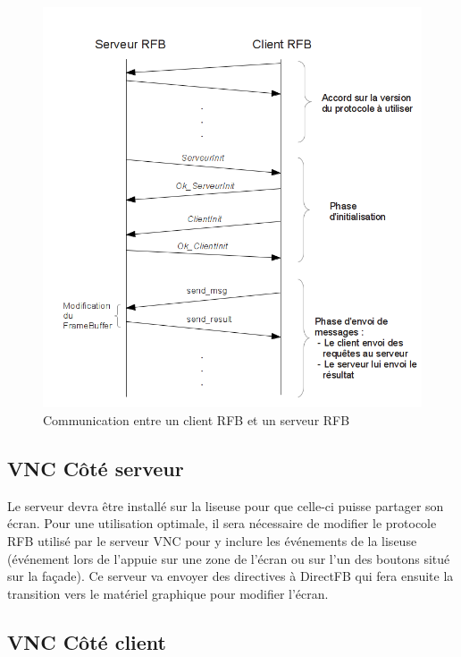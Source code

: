\begin{figure}[h!]
	\begin{center}
		\includegraphics[scale=0.6]{RFBProtocol.png}
		\caption{Communication entre un client RFB et un serveur RFB}
	\end{center}
\end{figure}

\subsection{VNC Côté serveur}

Le serveur devra être installé sur la liseuse pour que celle-ci puisse partager son écran. Pour une utilisation optimale, il sera nécessaire de modifier le protocole RFB utilisé par le serveur VNC pour y inclure les événements de la liseuse (événement lors de l'appuie sur une zone de l'écran ou sur l'un des boutons situé sur la façade). Ce serveur va envoyer des directives à DirectFB qui fera ensuite la transition vers le matériel graphique pour modifier l'écran.

\subsection{VNC Côté client}

